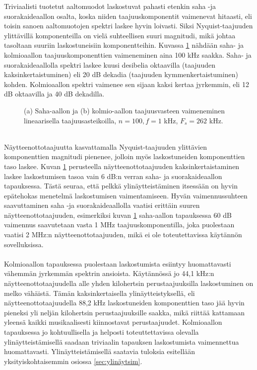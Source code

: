 \documentclass[finnish,12pt,a4paper,pdftex]{article} %
\begin{document}
Triviaalisti tuotetut aaltomuodot laskostuvat pahasti etenkin saha -ja suorakaideaallon osalta, koska niiden taajuuskomponentit vaimenevat hitaasti, eli toisin sanoen aaltomuotojen spektri laskee hyvin loivasti. Siksi Nyquist-taajuuden ylittävillä komponenteilla on vielä suhteellisen suuri magnitudi, mikä johtaa tasoltaan suuriin laskostuneisiin komponentteihin. Kuvassa \ref{fig:saha100} nähdään saha- ja kolmioaallon taajuuskomponenttien vaimeneminen aina 100 kHz saakka. Saha- ja suorakaideaallolla spektri laskee kuusi desibelia oktaavilla (taajuuden kaksinkertaistuminen) eli 20 dB dekadia (taajuuden kymmenkertaistuminen) kohden. Kolmioaallon spektri vaimenee sen sijaan kaksi kertaa jyrkemmin, eli 12 dB oktaavilla ja 40 dB dekadilla. \\
\begin{figure}[ht] 
\begin{center} 	
\caption{(a) Saha-aallon ja (b) kolmio-aallon taajuusvasteen vaimeneminen lineaarisella taajuusasteikoilla, $n = 100, f = 1$ kHz, $F_s = 262$ kHz.}
\label{fig:saha100}
\end{center}
\end{figure} \\
Näytteenottotaajuutta kasvattamalla Nyquist-taajuuden ylittävien komponenttien magnitudi pienenee, jolloin myös laskostuneiden komponenttien taso laskee. Kuvan \ref{fig:saha100} perusteella näytteenottotaajuuden kaksinkertaistaminen laskee laskostumisen tasoa vain 6 dB:n verran saha- ja suorakaideaallon tapauksessa. Tästä seuraa, että pelkkä ylinäytteistäminen itsessään on hyvin epätehokas menetelmä laskostumisen vaimentamiseen. Hyvän vaimennussuhteen saavuttaminen saha -ja suorakaideaallolla vaatisi erittäin suuren näytteenottotaajuuden, esimerkiksi kuvan \ref{fig:saha100} saha-aallon tapauksessa 60 dB vaimennus saavutetaan vasta 1 MHz taajuuskomponentilla, joka puolestaan vaatisi 2 MHz:n näytteenottotaajuuden, mikä ei ole toteutettavissa käytännön sovelluksissa. \\\\
Kolmioaallon tapauksessa puolestaan laskostumista esiintyy huomattavasti vähemmän jyrkemmän spektrin ansioista. Käytännössä jo 44,1 kHz:n näytteenottotaajuudella alle yhden kilohertsin perustaajuuksilla laskostuminen on melko vähäistä. Tämän kaksinkertaisella ylinäytteistyksellä, eli näytteenottotaajuudella 88,2 kHz laskostuneiden komponenttien taso jää hyvin pieneksi yli neljän kilohertsin perustaajuuksille saakka, mikä riittää kattamaan yleensä kaikki musikaalisesti kiinnostavat perustaajuudet. Kolmioaallon tapauksessa jo kohtuullisella ja helposti toteuttettavissa olevalla ylinäytteistämisellä saadaan triviaalin tapauksen laskostumista vaimennettua huomattavasti. Ylinäytteistämisellä saatavia tuloksia esitellään yksityiskohtaisemmin osiossa \ref{sec:ylinäytsim}. \\\\
\end{document}
